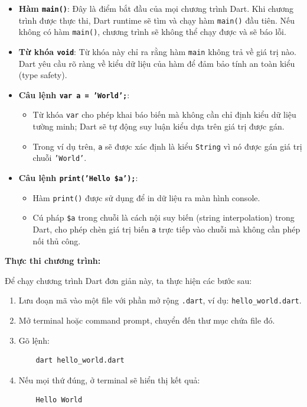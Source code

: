 \documentclass[../DoAn.tex]{subfiles}
\numberwithin{figure}{chapter}
\begin{document}
\begin{itemize}
    \item \textbf{Hàm \texttt{main()}}: Đây là điểm bắt đầu của mọi chương trình Dart. Khi chương trình được thực thi, Dart runtime sẽ tìm và chạy hàm \texttt{main()} đầu tiên. Nếu không có hàm \texttt{main()}, chương trình sẽ không thể chạy được và sẽ báo lỗi.
    
    \item \textbf{Từ khóa \texttt{void}}: Từ khóa này chỉ ra rằng hàm \texttt{main} không trả về giá trị nào. Dart yêu cầu rõ ràng về kiểu dữ liệu của hàm để đảm bảo tính an toàn kiểu (type safety).
    
    \item \textbf{Câu lệnh \texttt{var a = 'World';}}: 
    \begin{itemize}
        \item Từ khóa \texttt{var} cho phép khai báo biến mà không cần chỉ định kiểu dữ liệu tường minh; Dart sẽ tự động suy luận kiểu dựa trên giá trị được gán.
        \item Trong ví dụ trên, \texttt{a} sẽ được xác định là kiểu \texttt{String} vì nó được gán giá trị chuỗi \texttt{'World'}.
    \end{itemize}
    
    \item \textbf{Câu lệnh \texttt{print('Hello \$a');}}:
    \begin{itemize}
        \item Hàm \texttt{print()} được sử dụng để in dữ liệu ra màn hình console.
        \item Cú pháp \texttt{\$a} trong chuỗi là cách nội suy biến (string interpolation) trong Dart, cho phép chèn giá trị biến \texttt{a} trực tiếp vào chuỗi mà không cần phép nối thủ công.
    \end{itemize}
\end{itemize}

\textbf{Thực thi chương trình:} 

Để chạy chương trình Dart đơn giản này, ta thực hiện các bước sau:
\begin{enumerate}
    \item Lưu đoạn mã vào một file với phần mở rộng \texttt{.dart}, ví dụ: \texttt{hello\_world.dart}.
    \item Mở terminal hoặc command prompt, chuyển đến thư mục chứa file đó.
    \item Gõ lệnh:
    \begin{verbatim}
    dart hello_world.dart
    \end{verbatim}
    \item Nếu mọi thứ đúng, ở terminal sẽ hiển thị kết quả:
    \begin{verbatim}
    Hello World
    \end{verbatim}
\end{enumerate}
\end{document}
